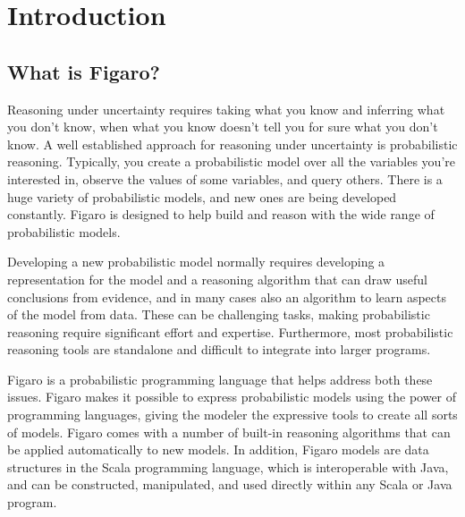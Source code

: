
\chapter{Introduction} %

\label{Introduction} %


\section{What is Figaro?}

Reasoning under uncertainty requires taking what you know and inferring what you don't know, when what you know doesn't tell you for sure what you don't know. A well established approach for reasoning under uncertainty is probabilistic reasoning. Typically, you create a probabilistic model over all the variables you're interested in, observe the values of some variables, and query others. There is a huge variety of probabilistic models, and new ones are being developed constantly. Figaro is designed to help build and reason with the wide range of probabilistic models.

Developing a new probabilistic model normally requires developing a representation for the model and a reasoning algorithm that can draw useful conclusions from evidence, and in many cases also an algorithm to learn aspects of the model from data. These can be challenging tasks, making probabilistic reasoning require significant effort and expertise. Furthermore, most probabilistic reasoning tools are standalone and difficult to integrate into larger programs.

Figaro is a probabilistic programming language that helps address both these issues. Figaro makes it possible to express probabilistic models using the power of programming languages, giving the modeler the expressive tools to create all sorts of models. Figaro comes with a number of built-in reasoning algorithms that can be applied automatically to new models. In addition, Figaro models are data structures in the Scala programming language, which is interoperable with Java, and can be constructed, manipulated, and used directly within any Scala or Java program.

